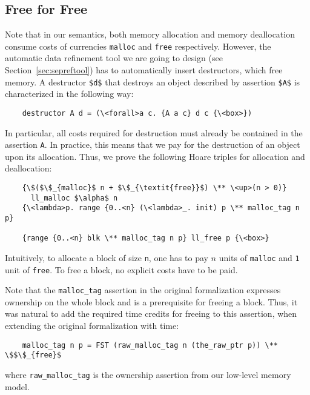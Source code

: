 \documentclass[acmsmall]{acmart}
\newcommand{\is}{\lstinline[language=isabelle]}
\begin{document}





\subsection{Free for Free}\label{sec:llvm-time:freeforfree}
Note that in our semantics, both memory allocation and memory deallocation consume costs of currencies \is{malloc} and \is{free} respectively.
However, the automatic data refinement tool we are going to design (see Section~\ref{sec:sepreftool}) has to automatically insert destructors, which free memory. 
A destructor \is{$d$} that destroys an object described by assertion \is{$A$} is characterized in the following way:
\begin{lstlisting}
    destructor A d = (\<forall>a c. {A a c} d c {\<box>})
\end{lstlisting}
In particular, all costs required for destruction must already be contained in the assertion \is$A$.
In practice, this means that we pay for the destruction of an object upon its allocation.
Thus, we prove the following Hoare triples for allocation and deallocation:
\begin{lstlisting}
    {\$($\$_{malloc}$ n + $\$_{\textit{free}}$) \** \<up>(n > 0)} 
      ll_malloc $\alpha$ n
    {\<lambda>p. range {0..<n} (\<lambda>_. init) p \** malloc_tag n p}

    {range {0..<n} blk \** malloc_tag n p} ll_free p {\<box>}
\end{lstlisting}
Intuitively, to allocate a block of size \is{n}, one has to pay $n$ units of \is{malloc} and \is$1$ unit of \is{free}.
To free a block, no explicit costs have to be paid.

Note that the \is{malloc_tag} assertion in the original formalization expresses ownership on the whole block and is a prerequisite for freeing a block. 
Thus, it was natural to add the required time credits for freeing to this assertion, when extending the original formalization with time:
\begin{lstlisting}
    malloc_tag n p = FST (raw_malloc_tag n (the_raw_ptr p)) \** \$$\$_{free}$
\end{lstlisting} %
where \is$raw_malloc_tag$ is the ownership assertion from our low-level memory model. 
\end{document}
